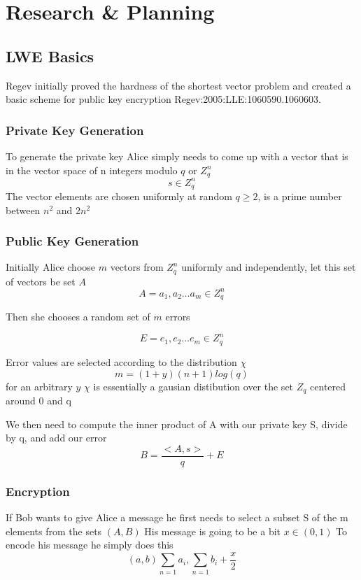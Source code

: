 \documentclass{article}
\begin{document}
\section{Research \& Planning}
\subsection{LWE Basics}
Regev initially proved the hardness of the shortest vector problem and created a basic scheme for public key encryption {Regev:2005:LLE:1060590.1060603}. 
\subsubsection{Private Key Generation}
To generate the private key Alice simply needs to come up with a vector that is in the vector space of n integers modulo $q$ or $Z_q^n$
\begin{equation*}
	s \in Z_q^n
\end{equation*}
The vector elements are chosen uniformly at random
$q \geq 2$, is a prime number between $n^2$ and $2n^2$

\subsubsection{Public Key Generation}
Initially Alice choose $m$ vectors from $Z_q^n$ uniformly and independently, let this set of vectors be set $A$
\begin{equation*}
A = a_1, a_2… a_m \in Z_q^n
\end{equation*}

Then she chooses a random set of $m$ errors

\begin{equation*}
E = e_1, e_2… e_m \in Z_q^n
\end{equation*}

Error values are selected according to the distribution $\chi$
\begin{equation*}
m = (1+y)(n+1)log(q) 
\end{equation*}
for an arbitrary $y$
$\chi$ is essentially a gausian distibution over the set $Z_q$ centered around 0 and q

We then need to compute the inner product of A with our private key S, divide by q, and add our error
\begin{equation*}
B = \frac{<A,s>}{q} + E 
\end{equation*}

\subsubsection{Encryption}
If Bob wants to give Alice a message he first needs to select a subset S of the m elements from the sets $(A,B)$
His message is going to be a bit $x \in (0,1)$
To encode his message he simply does this
\begin{equation*}
(a,b) \sum_{n=1}a_i, \sum_{n=1}b_i + \frac{x}{2}
\end{equation*}
\end{document}
